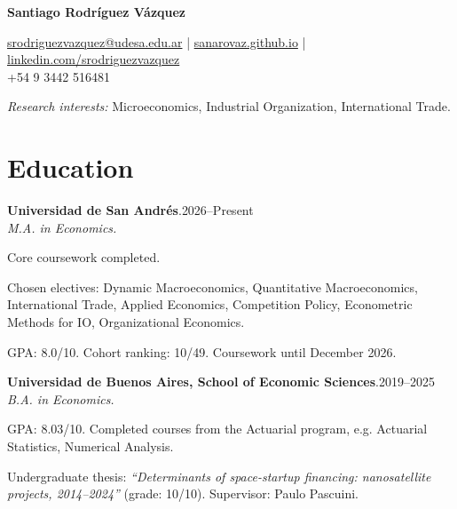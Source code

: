 \documentclass[11pt]{article}
\newcommand{\cvname}{Santiago Rodríguez Vázquez}
\newcommand{\entrydate}[1]{\hfill{\small{#1}}}
\begin{document}
\thispagestyle{firstpage}

{\LARGE\bfseries {\cvname}}

\href{mailto:srodriguezvazquez@udesa.edu.ar}{srodriguezvazquez@udesa.edu.ar} | \href{https://sanarovaz.github.io}{sanarovaz.github.io} | \href{https://www.linkedin.com/in/srodriguezvazquez/}{linkedin.com/srodriguezvazquez}
\\
+54 9 3442 516481

{\small \textit{Research interests:} Microeconomics, Industrial Organization, International Trade.}

\section{Education}
\textbf{Universidad de San Andrés}.\entrydate{2026--Present}\\
\textit{M.A. in Economics.}
\begin{cvitems}
  \item Core coursework completed. 
  \item Chosen electives: Dynamic Macroeconomics, Quantitative Macroeconomics, International Trade, Applied Economics, Competition Policy, Econometric Methods for IO, Organizational Economics. 
  \item GPA: 8.0/10. Cohort ranking: 10/49. Coursework until December 2026.
  \end{cvitems}

\smallskip
\textbf{Universidad de Buenos Aires, School of Economic Sciences}.\entrydate{2019--2025}\\
\textit{B.A. in Economics.}
\begin{cvitems}
  \item GPA: 8.03/10. Completed courses from the Actuarial program, e.g. Actuarial Statistics,
        Numerical Analysis.
  \item Undergraduate thesis: \emph{``Determinants of space-startup financing:
        nanosatellite projects, 2014--2024''} (grade: 10/10). Supervisor: Paulo Pascuini.
\end{cvitems}

\end{document}
